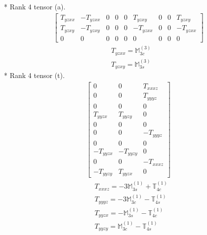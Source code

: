 \documentclass[fleqn,8pt,landscape]{jsarticle}
\begin{document}
* Rank 4 tensor (a).
\begin{align*}
\begin{bmatrix} T_{yzxx} & - T_{yzxx} & 0 & 0 & 0 & T_{yzxy} & 0 & 0 & T_{yzxy} \\ T_{yzxy} & - T_{yzxy} & 0 & 0 & 0 & - T_{yzxx} & 0 & 0 & - T_{yzxx} \\ 0 & 0 & 0 & 0 & 0 & 0 & 0 & 0 & 0 \end{bmatrix}
\end{align*}
\begin{align*}
& T_{yzxx} = \mathbb{M}_{3c}^{(3)} \\
& T_{yzxy} = \mathbb{M}_{3s}^{(3)}
\end{align*}
* Rank 4 tensor (t).
\begin{align*}
\begin{bmatrix} 0 & 0 & T_{xxxz} \\ 0 & 0 & T_{yyyz} \\ 0 & 0 & 0 \\ T_{yyzx} & T_{yyzy} & 0 \\ 0 & 0 & 0 \\ 0 & 0 & - T_{yyyz} \\ 0 & 0 & 0 \\ - T_{yyzx} & - T_{yyzy} & 0 \\ 0 & 0 & - T_{xxxz} \\ - T_{yyzy} & T_{yyzx} & 0 \end{bmatrix}
\end{align*}
\begin{align*}
& T_{xxxz} = - 3 \mathbb{M}_{3s}^{(1)} + \mathbb{T}_{4c}^{(1)} \\
& T_{yyyz} = - 3 \mathbb{M}_{3c}^{(1)} - \mathbb{T}_{4s}^{(1)} \\
& T_{yyzx} = - \mathbb{M}_{3s}^{(1)} - \mathbb{T}_{4c}^{(1)} \\
& T_{yyzy} = \mathbb{M}_{3c}^{(1)} - \mathbb{T}_{4s}^{(1)}
\end{align*}
\end{document}
